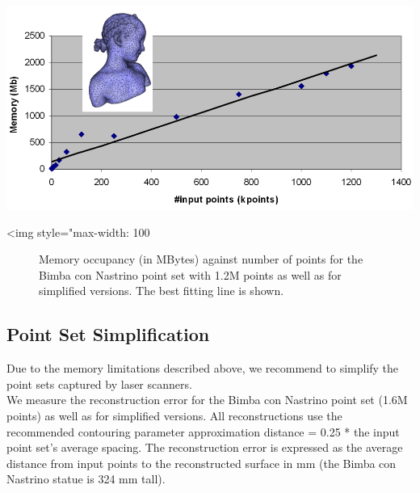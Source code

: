 \begin{center}
    \begin{ccTexOnly}
        \includegraphics[width=1.0\textwidth]{Surface_reconstruction_points_3/memory_bench}
    \end{ccTexOnly}
    \begin{ccHtmlOnly}
        <img style="max-width: 100%
    \end{ccHtmlOnly}
    \begin{figure}[h]
        \caption{Memory occupancy (in MBytes) against number of points
                 for the Bimba con Nastrino point set with 1.2M points
                 as well as for simplified versions.
                 The best fitting line is shown.}
        \label{Surface_reconstruction_points_3-fig-memory_bench}
    \end{figure}
\end{center}



\subsection{Point Set Simplification}

Due to the memory limitations described above, we recommend to simplify the point sets captured by laser scanners.\\
We measure the reconstruction error for the Bimba con Nastrino point set (1.6M points) as well as for simplified versions. All reconstructions use the recommended contouring parameter approximation distance = 0.25 * the input point set's average spacing.
The reconstruction error is expressed as the average distance from input points to the reconstructed surface in mm (the Bimba con Nastrino statue is 324 mm tall).

